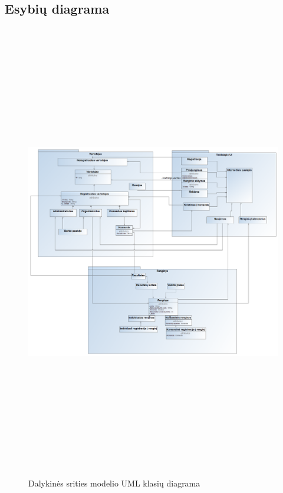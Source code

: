 \documentclass{VUMIFPSkursinis}
\begin{document}
        \subsection{Esybių diagrama} \label{strukturinisDSModelis_esybiuDiagrama}
            \begin{figure}[H]
                \centering
                \includegraphics[width=\textwidth, height=20cm, keepaspectratio]{img/PSI5/ClassDiagram.png}
                \caption{Dalykinės srities modelio UML klasių diagrama}
                \label{fig:DS-klasiu-diagrama}
            \end{figure}
\end{document}
